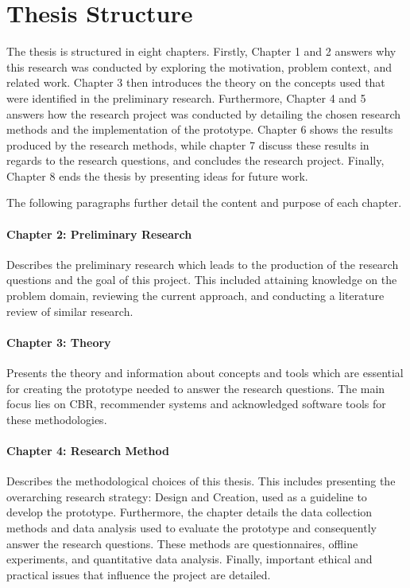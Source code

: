 \section{Thesis Structure}
The thesis is structured in eight chapters. Firstly, Chapter 1 and 2 answers why this research was conducted by exploring the motivation, problem context, and related work. Chapter 3 then introduces the theory on the concepts used that were identified in the preliminary research. Furthermore, Chapter 4 and 5 answers how the research project was conducted by detailing the chosen research methods and the implementation of the prototype. Chapter 6 shows the results produced by the research methods, while chapter 7 discuss these results in regards to the research questions, and concludes the research project. Finally, Chapter 8 ends the thesis by presenting ideas for future work. 

The following paragraphs further detail the content and purpose of each chapter.

\paragraph{Chapter 2: Preliminary Research}
Describes the preliminary research which leads to the production of the research questions and the goal of this project. This included attaining knowledge on the problem domain, reviewing the current approach, and conducting a literature review of similar research.

\paragraph{Chapter 3: Theory}
Presents the theory and information about concepts and tools which are essential for creating the prototype needed to answer the research questions. The main focus lies on CBR, recommender systems and acknowledged software tools for these methodologies. 

\paragraph{Chapter 4: Research Method}
Describes the methodological choices of this thesis. This includes presenting the overarching research strategy: Design and Creation, used as a guideline to develop the prototype. Furthermore, the chapter details the data collection methods and data analysis used to evaluate the prototype and consequently answer the research questions. These methods are questionnaires, offline experiments, and quantitative data analysis. Finally, important ethical and practical issues that influence the project are detailed. 

